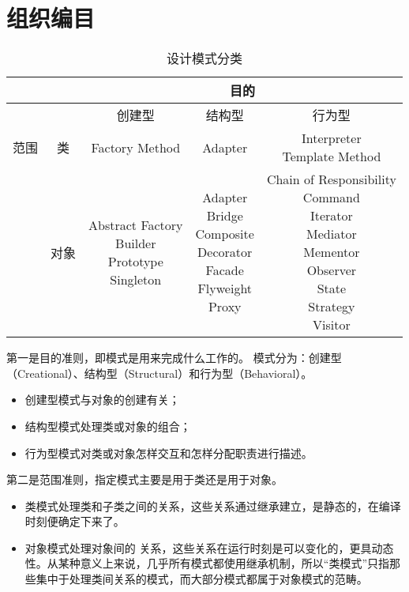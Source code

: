 \section{组织编目}
\begin{table}[!h]
	\centering
	\begin{tabular}{|c|c|c|c|c|}
		\hline
		\multicolumn{2}{|c|}{}&\multicolumn{3}{|c|}{目的}\\
		\hline
		\multicolumn{2}{|c|}{}&创建型&结构型&行为型\\
		\hline
		范围&类&Factory Method&Adapter&\tabincell{l}{Interpreter\\Template Method}\\
		\hline
		&对象&\tabincell{l}{Abstract Factory\\Builder\\Prototype\\Singleton}
		&\tabincell{l}{Adapter\\Bridge\\Composite\\Decorator\\Facade\\Flyweight\\Proxy}
		&\tabincell{l}{Chain of Responsibility\\Command\\Iterator\\Mediator\\Mementor
		\\Observer\\State\\Strategy\\Visitor}\\
		\hline
	\end{tabular}
	\caption{设计模式分类}
\end{table}
第一是目的准则，即模式是用来完成什么工作的。
模式分为：创建型（Creational）、结构型（Structural）和行为型（Behavioral）。
\begin{itemize}
	\item 创建型模式与对象的创建有关；
	\item 结构型模式处理类或对象的组合；
	\item 行为型模式对类或对象怎样交互和怎样分配职责进行描述。
\end{itemize}
第二是范围准则，指定模式主要是用于类还是用于对象。
\begin{itemize}
	\item 类模式处理类和子类之间的关系，这些关系通过继承建立，是静态的，在编译时刻便确定下来了。
	\item 对象模式处理对象间的
	关系，这些关系在运行时刻是可以变化的，更具动态性。从某种意义上来说，几乎所有模式都使用继承机制，所以“类模式”只指那些集中于处理类间关系的模式，而大部分模式都属于对象模式的范畴。
\end{itemize}